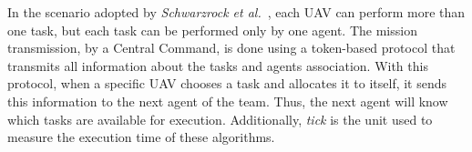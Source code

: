 In the scenario adopted by \textit{Schwarzrock et al.}~\citep{MAS07}, each UAV can perform more than one task, but each task can be performed only by one agent. The mission transmission, by a Central Command, is done using a token-based protocol that transmits all information about the tasks and agents association. With this protocol, when a specific UAV chooses a task and allocates it to itself, it sends this information to the next agent of the team. Thus, the next agent will know which tasks are available for execution. Additionally, \textit{tick} is the unit used to measure the execution time of these algorithms.